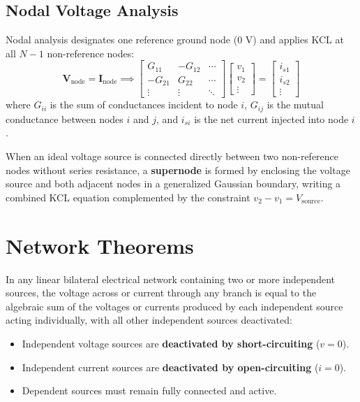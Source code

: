 \subsection{Nodal Voltage Analysis}
Nodal analysis designates one reference ground node ($0\text{ V}$) and applies KCL at all $N-1$ non-reference nodes:
\begin{equation}
[\mathbf{G}] \mathbf{V}_{\text{node}} = \mathbf{I}_{\text{node}} \implies \begin{bmatrix} G_{11} & -G_{12} & \cdots \\ -G_{21} & G_{22} & \cdots \\ \vdots & \vdots & \ddots \end{bmatrix} \begin{bmatrix} v_1 \\ v_2 \\ \vdots \end{bmatrix} = \begin{bmatrix} i_{s1} \\ i_{s2} \\ \vdots \end{bmatrix}
\end{equation}
where $G_{ii}$ is the sum of conductances incident to node $i$, $G_{ij}$ is the mutual conductance between nodes $i$ and $j$, and $i_{si}$ is the net current injected into node $i$.
\begin{definition}[Supernode]
When an ideal voltage source is connected directly between two non-reference nodes without series resistance, a \textbf{supernode} is formed by enclosing the voltage source and both adjacent nodes in a generalized Gaussian boundary, writing a combined KCL equation complemented by the constraint $v_2 - v_1 = V_{\text{source}}$.
\end{definition}

\section{Network Theorems}

\begin{theorem}
In any linear bilateral electrical network containing two or more independent sources, the voltage across or current through any branch is equal to the algebraic sum of the voltages or currents produced by each independent source acting individually, with all other independent sources deactivated:
\begin{itemize}
    \item Independent voltage sources are \textbf{deactivated by short-circuiting} ($v = 0$).
    \item Independent current sources are \textbf{deactivated by open-circuiting} ($i = 0$).
    \item Dependent sources must remain fully connected and active.
\end{itemize}
\end{theorem}


